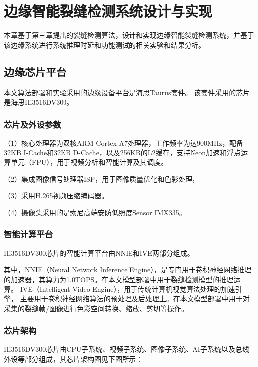 \chapter{边缘智能裂缝检测系统设计与实现}
本章基于第三章提出的裂缝检测算法，设计和实现边缘智能裂缝检测系统，并基于该边缘系统进行系统推理时延和功能测试的相关实验和结果分析。

\section{边缘芯片平台}
本文算法部署和实验采用的边缘设备平台是海思Taurus套件。
该套件采用的芯片是海思Hi3516DV300。

\subsection{芯片及外设参数}

（1）核心处理器为双核ARM Cortex-A7处理器，工作频率为达900MHz，配备32KB I-Cache和32KB D-Cache，以及256KB的L2缓存，支持Neon加速和浮点运算单元（FPU），用于视频分析和智能计算及其调度。

（2）集成图像信号处理器ISP，用于图像质量优化和色彩处理。

（3）采用H.265视频压缩编码器。

（4）摄像头采用的是索尼高端安防低照度Sensor IMX335。

\subsection{智能计算平台}
Hi3516DV300芯片的智能计算平台由NNIE和IVE两部分组成。

其中，NNIE（Neural Network Inference Engine），是专门用于卷积神经网络推理的加速器，其算力为1.0TOPS。在本文模型部署中用于裂缝检测模型的推理运算。
IVE（Intelligent Video Engine），用于传统计算机视觉算法处理的加速引擎，
主要用于卷积神经网络算法的预处理及后处理上。在本文模型部署中用于对采集的裂缝帧/图像进行色彩空间转换、缩放、剪切等操作。

\subsection{芯片架构}
Hi3516DV300芯片由CPU子系统、视频子系统、图像子系统、AI子系统以及总线外设等部分组成，其芯片架构图见下图所示：

